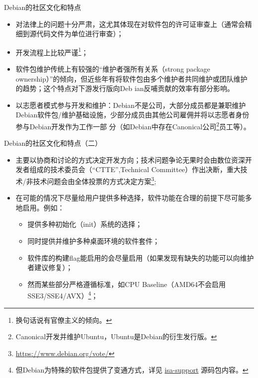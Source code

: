 \begin{frame}{Debian的社区文化和特点}
       \begin{itemize}
               \item 对法律上的问题十分严肃，这尤其体现在对软件包的许可证审查上（通常会精细到源代码文件为单位进行审查）；
               \item 开发流程上比较严谨\footnote{换句话说有官僚主义的倾向。}；
               \item 软件包维护传统上有较强的“维护者强所有关系（strong package ownership）”的倾向，但近些年有将软件包由多个维护者共同维护或团队维护的趋势；这个特点对下游发行版向Deb
ian反哺贡献的效率有部分影响。
               \item 以志愿者模式参与开发和维护：Debian不是公司，大部分成员都是兼职维护Debian软件包/维护基础设施，少部分成员由其他公司雇佣并将以志愿者身份参与Debian开发作为工作一部
分（如Debian中存在Canonical公司\footnote{Canonical开发并维护Ubuntu，Ubuntu是Debian的衍生发行版。}员工等）。
       \end{itemize}
\end{frame}

\begin{frame}{Debian的社区文化和特点（二）}
       \begin{itemize}
               \item 主要以协商和讨论的方式决定开发方向；技术问题争论无果时会由数位资深开发者组成的技术委员会（“CTTE”,Technical Committee）作出决断，重大技术/非技术问题会由全体投票的方式决定方案\footnote{\url{https://www.debian.org/vote/}};
               \item 在可能的情况下尽量给用户提供多种选择，软件功能在合理的前提下尽可能多地启用。例如：
               \begin{itemize}
                       \item 提供多种初始化（init）系统的选择；
                       \item 同时提供并维护多种桌面环境的软件套件；
                       \item 软件库的构建flag能启用的会尽量启用（如果发现有缺失的功能可以向维护者建议修复）；
                       \item 然而某些部分严格遵循标准，如CPU Baseline（AMD64不会启用SSE3/SSE4/AVX）\footnote{但Debian为特殊的软件包提供了变通方式，详见 \href{https://tracker.debian
.org/pkg/isa-support}{isa-support} 源码包内容。}；
               \end{itemize}
       \end{itemize}
\end{frame}